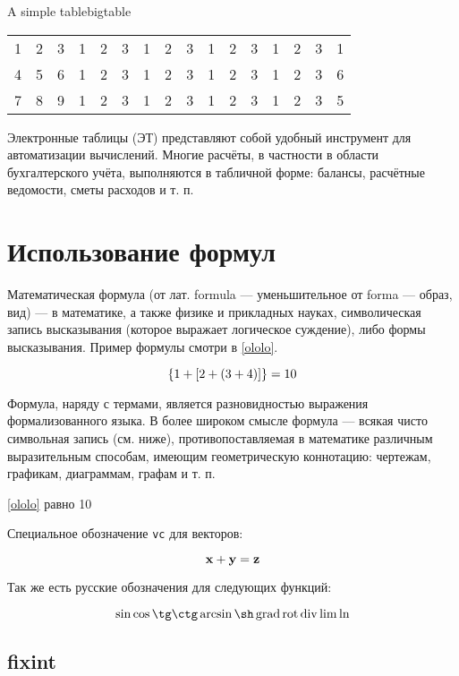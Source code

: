 \documentclass{universityreport}
\begin{document}
\begin{gosttable}{A simple table}{bigtable}
	\begin{tabular}{| c c c c c c c c c c c c c c c c |}
		\hline
		1 & 2 & 3 & 1 & 2 & 3 & 1 & 2 & 3 & 1 & 2 & 3 & 1 & 2 & 3 & 1 \\
		4 & 5 & 6 & 1 & 2 & 3 & 1 & 2 & 3 & 1 & 2 & 3 & 1 & 2 & 3 & 6 \\
		7 & 8 & 9 & 1 & 2 & 3 & 1 & 2 & 3 & 1 & 2 & 3 & 1 & 2 & 3 & 5 \\
		\hline
	\end{tabular}
\end{gosttable}

Электронные таблицы (ЭТ) представляют собой удобный инструмент для автоматизации вычислений. Многие расчёты, в частности в области бухгалтерского учёта, выполняются в табличной форме: балансы, расчётные ведомости, сметы расходов и т. п. 

\section{Использование формул}

Математическая формула (от лат. formula — уменьшительное от forma — образ, вид) — в математике, а также физике и прикладных науках, символическая запись высказывания (которое выражает логическое суждение), либо формы высказывания. Пример формулы смотри в \eqref{ololo}.

\begin{equation}\label{ololo}
\left\{1 + \left[2 + \left(3 + 4\right)\right]\right\} = 10
\end{equation}

Формула, наряду с термами, является разновидностью выражения формализованного языка. В более широком смысле формула — всякая чисто символьная запись (см. ниже), противопоставляемая в математике различным выразительным способам, имеющим геометрическую коннотацию: чертежам, графикам, диаграммам, графам и т. п.

\conclusion \eqref{ololo} равно 10

Специальное обозначение \texttt{vc} для векторов:

$$
\mathrm{\mathbf{x}} + \mathrm{\mathbf{y}} = \mathrm{\mathbf{z}}
$$

Так же есть русские обозначения для следующих функций:

$$
\sin \cos \tg \ctg \arcsin \sh \rugrad \rurot \rudiv \lim \ln
$$

\subsection{fixint}
\end{document}
